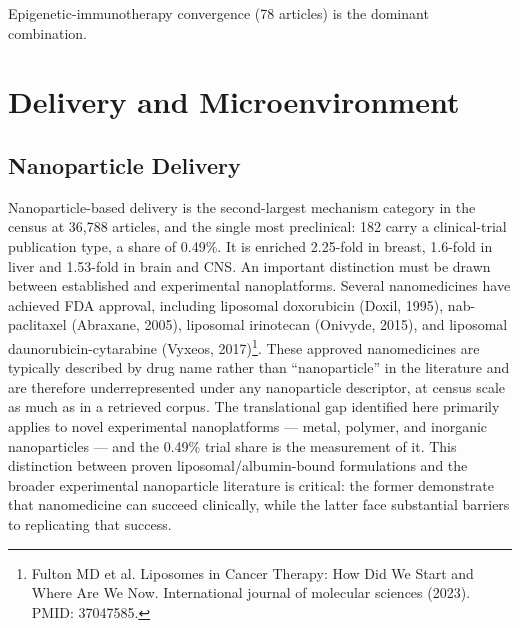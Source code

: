 \documentclass[11pt,twoside,openright]{report}
\begin{document}
Epigenetic-immunotherapy convergence (78 articles) is the dominant combination.

\section{Delivery and Microenvironment}

\subsection{Nanoparticle Delivery}

Nanoparticle-based delivery is the second-largest mechanism category in the census at 36,788 articles, and the single most preclinical: 182 carry a clinical-trial publication type, a share of 0.49\%. It is enriched 2.25-fold in breast, 1.6-fold in liver and 1.53-fold in brain and CNS. An important distinction must be drawn between established and experimental nanoplatforms. Several nanomedicines have achieved FDA approval, including liposomal doxorubicin (Doxil, 1995), nab-paclitaxel (Abraxane, 2005), liposomal irinotecan (Onivyde, 2015), and liposomal daunorubicin-cytarabine (Vyxeos, 2017)\footnote{Fulton MD et al. Liposomes in Cancer Therapy: How Did We Start and Where Are We Now. International journal of molecular sciences (2023). PMID: 37047585.}. These approved nanomedicines are typically described by drug name rather than ``nanoparticle'' in the literature and are therefore underrepresented under any nanoparticle descriptor, at census scale as much as in a retrieved corpus. The translational gap identified here primarily applies to novel experimental nanoplatforms --- metal, polymer, and inorganic nanoparticles --- and the 0.49\% trial share is the measurement of it. This distinction between proven liposomal/albumin-bound formulations and the broader experimental nanoparticle literature is critical: the former demonstrate that nanomedicine can succeed clinically, while the latter face substantial barriers to replicating that success.
\end{document}
